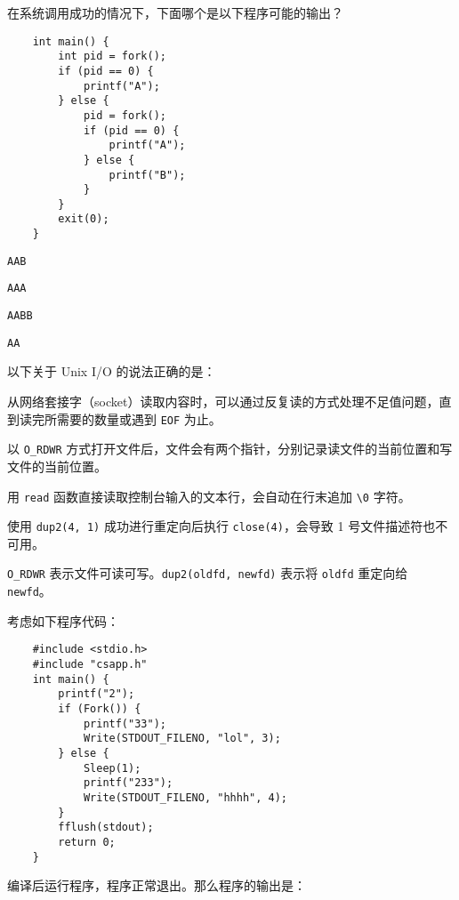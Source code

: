 \begin{problems}
\begin{choices}
        \end{choices}
         在系统调用成功的情况下，下面哪个是以下程序可能的输出？
        \begin{verbatim}
    int main() {
        int pid = fork();
        if (pid == 0) {
            printf("A");
        } else {
            pid = fork();
            if (pid == 0) {
                printf("A");
            } else {
                printf("B");
            }
        }
        exit(0);
    }
        \end{verbatim}
        \begin{choices}
            \item \verb|AAB|
            \item \verb|AAA|
            \item \verb|AABB|
            \item \verb|AA|
        \end{choices}
         以下关于 Unix I/O 的说法正确的是：
        \begin{choices}
            \item 从网络套接字（socket）读取内容时，可以通过反复读的方式处理不足值问题，直到读完所需要的数量或遇到 \verb|EOF| 为止。
            \item 以 \verb|O_RDWR| 方式打开文件后，文件会有两个指针，分别记录读文件的当前位置和写文件的当前位置。
            \item 用 \verb|read| 函数直接读取控制台输入的文本行，会自动在行末追加 \verb|\0| 字符。
            \item 使用 \verb|dup2(4, 1)| 成功进行重定向后执行 \verb|close(4)|，会导致 1 号文件描述符也不可用。
        \end{choices}
        \begin{hint}
            \verb|O_RDWR| 表示文件可读可写。\verb|dup2(oldfd, newfd)| 表示将 \verb|oldfd| 重定向给 \verb|newfd|。
        \end{hint}
         考虑如下程序代码：
        \begin{verbatim}
    #include <stdio.h>
    #include "csapp.h"
    int main() {
        printf("2");
        if (Fork()) {
            printf("33");
            Write(STDOUT_FILENO, "lol", 3);
        } else {
            Sleep(1);
            printf("233");
            Write(STDOUT_FILENO, "hhhh", 4);
        }
        fflush(stdout);
        return 0;
    }
        \end{verbatim}
        编译后运行程序，程序正常退出。那么程序的输出是：

\end{problems}
